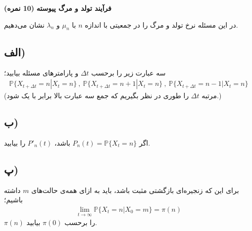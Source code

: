 \Large \textbf{فرآیند تولد و مرگ پیوسته}
\large \textbf{(10 نمره)}

\normalsize \vspace{0.5cm}

در این مسئله نرخ تولد و مرگ را در جمعیتی با اندازه 
$n$ با 
$\mu_n$ و $\lambda_n$ نشان می‌دهیم.
\subsection*{الف)}
سه عبارت زیر را برحسب 
$\Delta t$ و پارامترهای مسئله بیابید؛
\begin{gather*}
    \mathbb{P}\{ X_{t+\Delta t}=n|X_t=n\}\ , \ \mathbb{P}\{ X_{t+\Delta t}=n+1|X_t=n\}\ , \ \mathbb{P}\{ X_{t+\Delta t}=n-1|X_t=n\}
\end{gather*}
 (مرتبه 
 $\Delta t$ را طوری در نظر بگیریم که جمع سه عبارت بالا برابر با یک شود.)

\subsection*{ب)}
اگر 
$P_n(t)=\mathbb{P}\{X_t=n\}$ باشد، 
$P'_n(t)$ را بیابید.
\subsection*{پ)}
برای این که زنجیره‌ای بازگشتی مثبت باشد، باید به ازای همه‌ی حالت‌های 
$m$
داشته باشیم؛
\begin{gather*}
    \lim_{t\rightarrow \infty}\mathbb{P}\{X_t=n|X_0=m\}=\pi(n)
\end{gather*}
$\pi(n)$ را برحسب 
$\pi(0)$ بیابید.